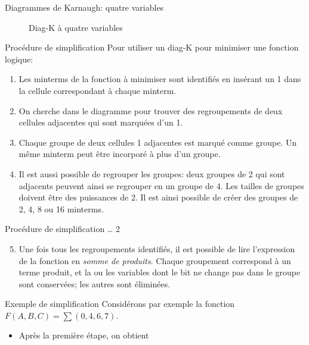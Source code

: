 \documentclass[presentation]{beamer}
\begin{document}
\begin{frame}[label={sec:org45d4bed}]{Diagrammes de Karnaugh: quatre variables}
\begin{figure}[htbp]
\centering

\caption{\label{fig:org57923e0}Diag-K à quatre variables}
\end{figure}
\end{frame}

\begin{frame}[label={sec:org1ad7609}]{Procédure de simplification}
Pour utiliser un diag-K pour minimiser une fonction logique: 

\begin{enumerate}
\item Les minterms de la fonction à minimiser sont identifiés en insérant
un 1 dans la cellule correspondant à chaque minterm.
\item On cherche dans le diagramme pour trouver des regroupements de deux
cellules adjacentes qui sont marquées d'un 1.
\item Chaque groupe de deux cellules 1 adjacentes est marqué comme
groupe. Un même minterm peut être incorporé à plus d'un groupe.
\item Il est aussi possible de regrouper les groupes: deux groupes de 2
qui sont adjacents peuvent ainsi se regrouper en un groupe
de 4. Les tailles de groupes doivent être des puissances de 2. Il
est ainsi possible de créer des groupes de 2, 4, 8 ou 16 minterms.
\end{enumerate}
\end{frame}

\begin{frame}[label={sec:orgbdadabf}]{Procédure de simplification \ldots{} 2}
\begin{enumerate}
\setcounter{enumi}{4}
\item Une fois tous les regroupements identifiés, il est possible de lire
l'expression de la fonction en \emph{somme de produits}. Chaque groupement
correspond à un terme produit, et la ou les variables dont le bit ne
change pas dans le groupe sont conservées; les autres sont
éliminées.
\end{enumerate}
\end{frame}

\begin{frame}[label={sec:orgd8d9e0b}]{Exemple de simplification}
Considérons par exemple la fonction \(F(A,B,C) = \sum (0, 4, 6, 7)\). 

\begin{itemize}
\item Après la première étape, on obtient
\end{itemize}

\begin{center}

\label{org897710e}
\end{center}
\end{frame}
\end{document}
